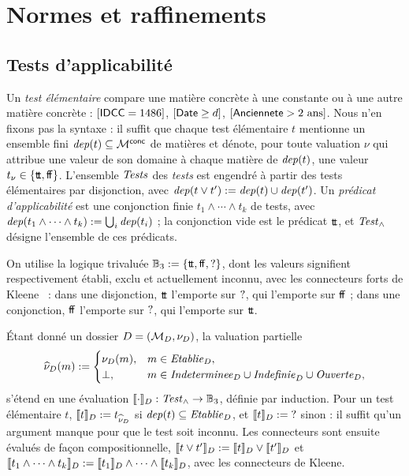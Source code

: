 \documentclass[review]{jflart}
\begin{document}
\section{Normes et raffinements}\label{sec:forest}

\subsection{Tests d'applicabilité}

Un \emph{test élémentaire} compare une matière concrète à une constante ou à
une autre matière concrète : \([\mathsf{IDCC}=1486]\), \([\mathsf{Date}\geq d]\),
\([\mathsf{Anciennete}>\text{2 ans}]\). Nous n'en fixons pas la syntaxe : il suffit que
chaque test élémentaire \(t\) mentionne un ensemble fini
\(\mathit{dep}(t)\subseteq\mathcal{M}^{\mathsf{conc}}\) de matières et dénote, pour toute valuation
\(\nu\) qui attribue une valeur de son domaine à chaque matière de \(\mathit{dep}(t)\),
une valeur \(t_\nu\in\{{\mathsf{t\!t}},{\mathsf{f\!f}}\}\). L'ensemble \(\mathit{Tests}\) des
\emph{tests} est engendré à partir des tests élémentaires par disjonction,
avec \(\mathit{dep}(t\lor t'):=\mathit{dep}(t)\cup\mathit{dep}(t')\). Un \emph{prédicat
d'applicabilité} est une conjonction finie \(t_1\land\cdots\land t_k\) de
tests, avec \(\mathit{dep}(t_1\land\cdots\land t_k):=\bigcup_i\mathit{dep}(t_i)\) ; la
conjonction vide est le prédicat \({\mathsf{t\!t}}\), et \(\mathit{Test}_{{}\wedge{}}\) désigne l'ensemble de
ces prédicats.

On utilise la logique trivaluée \(\mathbb{B}_3:=\{{\mathsf{t\!t}},{\mathsf{f\!f}},\mathord{?}\}\), dont les
valeurs signifient respectivement établi, exclu et actuellement inconnu, avec
les connecteurs forts de Kleene~\cite{kleene1952introduction} : dans une disjonction, \({\mathsf{t\!t}}\) l'emporte sur \(\mathord{?}\), qui
l'emporte sur \({\mathsf{f\!f}}\) ; dans une conjonction, \({\mathsf{f\!f}}\) l'emporte sur
\(\mathord{?}\), qui l'emporte sur \({\mathsf{t\!t}}\).

\begin{defi}\label{def:applicability-predicate}
Étant donné un dossier \(D=(\mathcal{M}_D,\nu_D)\), la valuation partielle
\[
 \widehat \nu_D(m):=
 \begin{cases}
  \nu_D(m),&m\in\mathit{Etablie}_D,\\
  \bot,&m\in\mathit{Indeterminee}_D\cup\mathit{Indefinie}_D\cup\mathit{Ouverte}_D,
 \end{cases}
\]
s'étend en une évaluation \(\llbracket \cdot\rrbracket_D:\mathit{Test}_{{}\wedge{}}\to\mathbb{B}_3\), définie par
induction. Pour un test élémentaire \(t\), \(\llbracket t\rrbracket_D:=t_{\widehat\nu_D}\) si
\(\mathit{dep}(t)\subseteq\mathit{Etablie}_D\), et \(\llbracket t\rrbracket_D:=\mathord{?}\) sinon : il suffit
qu'un argument manque pour que le test soit inconnu. Les connecteurs sont
ensuite évalués de façon compositionnelle,
\(\llbracket t\lor t'\rrbracket_D:=\llbracket t\rrbracket_D\lor\llbracket t'\rrbracket_D\) et
\(\llbracket t_1\land\cdots\land t_k\rrbracket_D:=\llbracket t_1\rrbracket_D\land\cdots\land\llbracket t_k\rrbracket_D\),
avec les connecteurs de Kleene.
\end{defi}
\end{document}
